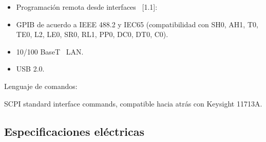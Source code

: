 \begin{itemize}
	\item Programación remota desde interfaces \ [1.1]:
	\item GPIB de acuerdo a IEEE 488.2 y IEC65 (compatibilidad con SH0, AH1, T0, TE0, L2, LE0, SR0, RL1, PP0, DC0, DT0, C0).
	\item 10/100 BaseT \ LAN.
	\item USB 2.0.
\end{itemize}
Lenguaje de comandos:

SCPI standard interface commands, compatible hacia atrás con Keysight 11713A.

\subsection{Especificaciones eléctricas}

